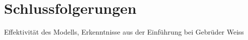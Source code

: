 \chapter{Schlussfolgerungen}

Effektivität des Modells, Erkenntnisse aus der Einführung bei Gebrüder Weiss
